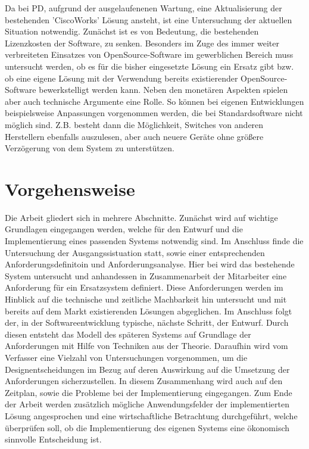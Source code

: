 Da bei PD, aufgrund der ausgelaufenenen Wartung, eine Aktualisierung der bestehenden 'CiscoWorks' Lösung ansteht, ist eine Untersuchung der aktuellen Situation notwendig.
Zunächst ist es von Bedeutung, die bestehenden Lizenzkosten der Software, zu senken.
Besonders im Zuge des immer weiter verbreiteten Einsatzes von OpenSource-Software im gewerblichen Bereich muss untersucht werden, ob es für die bisher eingesetzte Lösung ein Ersatz gibt bzw. ob eine eigene Lösung mit der Verwendung bereits existierender OpenSource-Software bewerkstelligt werden kann.
Neben den monetären Aspekten spielen aber auch technische Argumente eine Rolle.
So können bei eigenen Entwicklungen beispielsweise Anpassungen vorgenommen werden, die bei Standardsoftware nicht möglich sind.
Z.B. besteht dann die Möglichkeit, Switches von anderen Herstellern ebenfalls auszulesen, aber auch neuere Geräte ohne größere Verzögerung von dem System zu unterstützen.

\section{Vorgehensweise}

Die Arbeit gliedert sich in mehrere Abschnitte.
Zunächst wird auf wichtige Grundlagen eingegangen werden, welche für den Entwurf und die Implementierung eines passenden Systems notwendig sind.
Im Anschluss finde die Untersuchung der Ausgangssistuation statt, sowie einer entsprechenden Anforderungsdefinitoin und Anforderungsanalyse.
Hier bei wird das bestehende System untersucht und anhandessen in Zusammenarbeit der Mitarbeiter eine Anforderung für ein Ersatzsystem definiert.
Diese Anforderungen werden im Hinblick auf die technische und zeitliche Machbarkeit hin untersucht und mit bereits auf dem Markt existierenden Lösungen abgeglichen.
Im Anschluss folgt der, in der Softwareentwicklung typische, nächste Schritt, der Entwurf.
Durch diesen entsteht das Modell des späteren Systems auf Grundlage der Anforderungen mit Hilfe von Techniken aus der Theorie.
Daraufhin wird vom Verfasser eine Vielzahl von Untersuchungen vorgenommen, um die Designentscheidungen im Bezug auf deren Auswirkung auf die Umsetzung der Anforderungen sicherzustellen.
In diesem Zusammenhang wird auch auf den Zeitplan, sowie die Probleme bei der Implementierung eingegangen.
Zum Ende der Arbeit werden zusätzlich mögliche Anwendungsfelder der implementierten Lösung angesprochen und eine wirtschaftliche Betrachtung durchgeführt, welche überprüfen soll, ob die Implementierung des eigenen Systems eine ökonomisch sinnvolle Entscheidung ist.\\